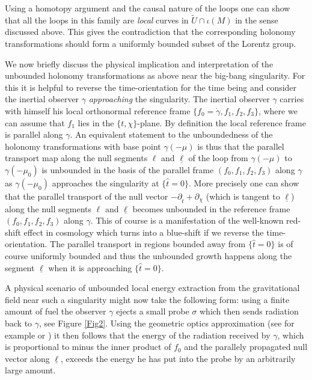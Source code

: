 \documentclass[reqno]{article}
\newcommand{\rd}{\partial}
\begin{document}
Using a homotopy argument and the causal nature of the loops one can show that all the loops in this family are \emph{local} curves in $\tilde{U} \cap \iota(M)$ in the sense discussed above. This gives the contradiction that the corresponding holonomy transformations should form a uniformly bounded subset of the Lorentz group.
\newline

We now briefly discuss the physical implication and interpretation of the unbounded holonomy transformations as above near the big-bang singularity. For this it is helpful to reverse the time-orientation for the time being and consider the inertial observer $\gamma$ \emph{approaching} the singularity. The inertial observer $\gamma$ carries with himself his local orthonormal reference frame $\{f_0 = \dot{\gamma}, f_1, f_2, f_3\}$, where we can assume that $f_1$ lies in the $\{t, \chi\}$-plane. By definition the local reference frame is parallel along $\gamma$. An equivalent statement to the unboundedness of the holonomy transformations with base point $\gamma(-\mu)$ is thus that the parallel transport map along the null segments $\ell$ and $\underline{\ell}$ of the loop from $\gamma(-\mu)$ to $\gamma(-\mu_0)$ is unbounded in the basis of the parallel frame $(f_0, f_1, f_2, f_3)$ along $\gamma$ as $\gamma(-\mu_0)$ approaches the singularity at $\{\hat{t} = 0\}$. More precisely one can show that the parallel transport of the null vector $-\rd_{\hat{t}} + \rd_\chi$ (which is tangent to $\underline{\ell}$) along the null segments $\ell$ and $\underline{\ell}$ becomes unbounded in the reference frame $(f_0, f_1, f_2, f_3)$ along $\gamma$. This of course is a manifestation of the well-known red-shift effect in cosmology which turns into a blue-shift if we reverse the time-orientation. The parallel transport in regions bounded away from $\{\hat{t} = 0\}$ is of course uniformly bounded and thus the unbounded growth happens along the segment $\underline{\ell}$ when it is approaching $\{\hat{t}=0\}$.

A physical scenario of unbounded local energy extraction from the gravitational field near such a singularity might now take the following form: using a finite amount of fuel the observer $\gamma$ ejects a small probe $\sigma$ which then sends radiation back to $\gamma$, see Figure \ref{Fig2}. Using the geometric optics approximation (see for example \cite{MTW} or \cite{Sbie13b}) it then follows that the energy of the radiation received by $\gamma$, which is proportional to minus the inner product of $f_0$ and the parallely propagated null vector along $\underline{\ell}$, exceeds the energy he has put into the probe by an arbitrarily large amount. 
\end{document}
